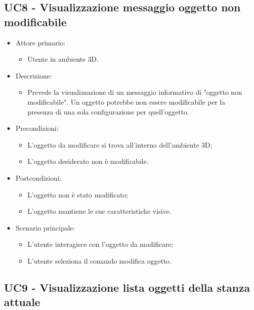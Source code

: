 \pagebreak

\subsection{UC8 - Visualizzazione messaggio oggetto non modificabile}
\begin{itemize}

	\item Attore primario: 
	\begin{itemize}
		\item Utente in ambiente 3D.
	\end{itemize}
	\item Descrizione:
	\begin{itemize}
		\item Prevede la visualizzazione di un messaggio informativo di "oggetto non modificabile".
\newline Un oggetto potrebbe non essere modificabile per la presenza di una sola configurazione per quell'oggetto.
	\end{itemize}
	
	\item Precondizioni:
	\begin{itemize}
		\item L'oggetto da modificare si trova all'interno dell'ambiente 3D;
		\item L'oggetto desiderato non è modificabile.
	\end{itemize}
	
	\item Postcondizioni:
	\begin{itemize}
		\item L'oggetto non è stato modificato;
		\item L'oggetto mantiene le sue caratteristiche visive.
	\end{itemize}
	
	\item Scenario principale:
	\begin{itemize}
		\item L'utente interagisce con l'oggetto da modificare;
		\item L'utente seleziona il comando modifica oggetto.
	\end{itemize}
	
\end{itemize}

\pagebreak

\subsection{UC9 - Visualizzazione lista oggetti della stanza attuale}

